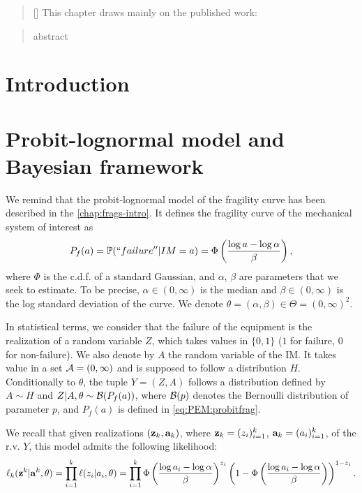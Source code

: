 


\begin{abstract}[\hspace*{-10pt}]
    This chapter draws mainly on the published work:   %
\end{abstract}

\begin{abstract}
    abstract
\end{abstract}


\minitoc

\section{Introduction}


\section{Probit-lognormal model and Bayesian framework}

We remind that the probit-lognormal model of the fragility curve has been described in the \cref{chap:frags-intro}.
It defines the fragility curve of the mechanical system of interest as 
\begin{equation}\label{eq:PEM:probitfrag}
    P_f(a)=\mathbb{P}({``failure''}|IM=a) = \Phi\left(\frac{\log a-\log\alpha}{\beta}\right),
\end{equation}
where $\Phi$ is the c.d.f. of a standard Gaussian, and $\alpha$, $\beta$ are parameters that we seek to estimate. To be precise, $\alpha\in(0,\infty)$ is the median and $\beta\in(0,\infty)$ is the log standard deviation of the curve. We denote $\theta=(\alpha,\beta)\in\Theta=(0,\infty)^2$.

In statistical terms, we consider that the failure of the equipment is the realization of a random variable $Z$, which takes values in $\{0,1\}$ ($1$ for failure, $0$ for non-failure). We also denote by $A$ the random variable of the IM. It takes value in a set $\mathcal{A}=(0,\infty)$ and is supposed to follow a distribution $H$. Conditionally to $\theta$, the tuple $Y=(Z,A)$ follows a distribution defined by $A\sim H$ and $Z|A,\theta\sim\mathcal{B}(P_f(a))$, where $\mathcal{B}(p)$ denotes the Bernoulli distribution of parameter $p$, and $P_f(a)$ is defined in \cref{eq:PEM:probitfrag}.

We recall that given realizations $(\mathbf{z}_k,\mathbf{a}_k)$, where $\mathbf{z}_k=(z_i)_{i=1}^k$, $\mathbf{a}_k=(a_i)_{i=1}^k$, of the r.v. $Y$, this model admits the following likelihood:
\begin{equation}
    \ell_k(\mathbf{z}^k|\mathbf{a}^k,\theta) = \prod_{i=1}^k\ell(z_i|a_i,\theta) = \prod_{i=1}^k\Phi\left(\frac{\log a_i-\log\alpha}{\beta}\right)^{z_i}\left(1-\Phi\left(\frac{\log a_i-\log\alpha}{\beta}\right)\right)^{1-z_i}.
\end{equation}




